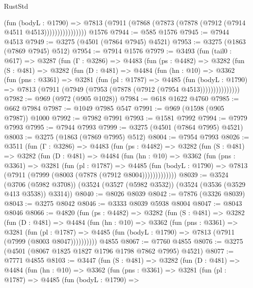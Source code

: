 \begin{lexlean}{RustStd}
\begin{coremodule}
                      (fun (bodyL : @1790) =>
                      @7813 (@7911 (@7868 (@7873 (@7878 (@7912 (@7914 @4511 @4513))))))))))))))))
    @1576
@7944 := @585 @1576
@7945 := @7944 @4513
@7949 := @3275 (@4501 (@7864 @7945) @4521)
@7953 := @3275 (@1863 (@7869 @7945) @512)
@7954 := @7914 @1576
@7979 := @3493
    (fun (tail0 : @617) =>
    @3287
      (fun (Γ : @3286) =>
      @4483
        (fun (ps : @4482) =>
        @3282
          (fun (S : @481) =>
          @3282
            (fun (D : @481) =>
            @4484
              (fun (hn : @10) =>
              @3362
                (fun (pns : @3361) =>
                @3281
                  (fun (pl : @1787) =>
                  @4485
                    (fun (bodyL : @1790) =>
                    @7813 (@7911 (@7949 (@7953 (@7878 (@7912 (@7954 @4513)))))))))))))))
@7982 := @969 (@972 (@905 @1028))
@7984 := @618 @1622 @4760
@7985 := @662 @7984
@7987 := @1049 @7985 @547
@7991 := @969 (@1598 (@905 @7987)) @1000
@7992 := @7982 @7991
@7993 := @1581 @7992
@7994 := @7979 @7993
@7995 := @7944 @7993
@7999 := @3275 (@4501 (@7864 @7995) @4521)
@8003 := @3275 (@1863 (@7869 @7995) @512)
@8004 := @7954 @7993
@8026 := @3511
    (fun (Γ : @3286) =>
    @4483
      (fun (ps : @4482) =>
      @3282
        (fun (S : @481) =>
        @3282
          (fun (D : @481) =>
          @4484
            (fun (hn : @10) =>
            @3362
              (fun (pns : @3361) =>
              @3281
                (fun (pl : @1787) =>
                @4485
                  (fun (bodyL : @1790) =>
                  @7813 (@7911 (@7999 (@8003 (@7878 (@7912 @8004)))))))))))))
@8039 := @3524
    (@3706 (@5982 @3708))
    (@3524 (@3527 (@5982 @3532)) (@3524 (@3536 (@3529 @413 @3538)) @3314))
@8040 := @8026 @8039
@8042 := @7876 (@3326 @8039)
@8043 := @3275 @8042
@8046 := @3333 @8039 @5938 @8004
@8047 := @8043 @8046
@8066 := @4820
    (fun (ps : @4482) =>
    @3282
      (fun (S : @481) =>
      @3282
        (fun (D : @481) =>
        @4484
          (fun (hn : @10) =>
          @3362
            (fun (pns : @3361) =>
            @3281
              (fun (pl : @1787) =>
              @4485 (fun (bodyL : @1790) => @7813 (@7911 (@7999 (@8003 @8047))))))))))
    @4855
@8067 := @7760 @4855
@8076 := @3275 (@4501 (@8067 @1825 @1827 @1796 @1798 @7862 @7995) @4521)
@8077 := @7771 @4855
@8103 := @3447
    (fun (S : @481) =>
    @3282
      (fun (D : @481) =>
      @4484
        (fun (hn : @10) =>
        @3362
          (fun (pns : @3361) =>
          @3281
            (fun (pl : @1787) =>
            @4485
              (fun (bodyL : @1790) =>

\end{coremodule}
\end{lexlean}
